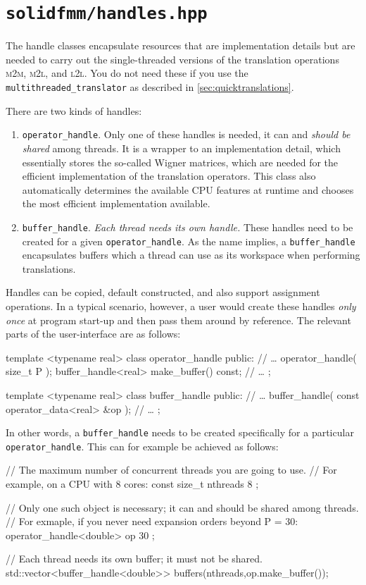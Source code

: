 \documentclass{scrbook}
\newcommand{\MtoM}{\textsc{m2m}}
\newcommand{\MtoL}{\textsc{m2l}}
\newcommand{\LtoL}{\textsc{l2l}}
\begin{document}
\section{\texttt{solidfmm/handles.hpp}}\label{sec:handles}
The handle classes encapsulate resources that are implementation details but
are needed to carry out the single-threaded versions of the translation
operations \MtoM, \MtoL, and \LtoL. You do not need these if you use the
\lstinline|multithreaded_translator| as described in
\cref{sec:quicktranslations}.

There are two kinds of handles:
\begin{enumerate}
\item \lstinline|operator_handle|. Only one of these handles is needed, it
can and \emph{should be shared} among threads. It is a wrapper to an
implementation detail, which essentially stores the so-called Wigner matrices,
which are needed for the efficient implementation of the translation operators.
This class also automatically determines the available CPU features at runtime
and chooses the most efficient implementation available.
\item \lstinline|buffer_handle|. \emph{Each thread needs its own handle.} These
handles need to be created for a given \lstinline|operator_handle|. As the
name implies, a \lstinline|buffer_handle| encapsulates buffers which a thread
can use as its workspace when performing translations.
\end{enumerate}

Handles can be copied, default constructed, and also support assignment
operations. In a typical scenario, however, a user would create these handles
\emph{only once} at program start-up and then pass them around by reference.
The relevant parts of the user-interface are as follows:
\begin{cppcode*}
template <typename real>
class operator_handle
{
public:
	// …
    operator_handle( size_t P );
    buffer_handle<real> make_buffer() const;    
	// …
};

template <typename real>
class buffer_handle
{
public:
	// …
    buffer_handle( const operator_data<real> &op );
	// …
};
\end{cppcode*}

In other words, a \lstinline|buffer_handle| needs to be created specifically
for a particular \lstinline|operator_handle|. This can for example be achieved
as follows:
\begin{cppcode*}
// The maximum number of concurrent threads you are going to use.
// For example, on a CPU with 8 cores:
const size_t nthreads { 8 };

// Only one such object is necessary; it can and should be shared among threads.
// For exmaple, if you never need expansion orders beyond P = 30:
operator_handle<double> op  { 30 }; 
                                     
// Each thread needs its own buffer; it must not be shared.
std::vector<buffer_handle<double>> buffers(nthreads,op.make_buffer());
\end{cppcode*}
\end{document}
